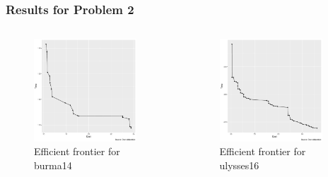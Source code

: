 \documentclass[aspectratio=169]{beamer}
\begin{document}
{\begin{frame}
\frametitle{Results for Problem 2}
\begin{columns}
\begin{figure}[ht]
\centering
\includegraphics[width=0.9\textwidth]{images/efficient-frontier:1.pdf}
\caption{Efficient frontier for burma14}
\end{figure}
 

\begin{figure}[ht]
\centering
\includegraphics[width=0.9\textwidth]{images/efficient-frontier:2.pdf}
\caption{Efficient frontier for ulysses16}
\end{figure}
\end{columns}
\end{frame}


}
\end{document}
